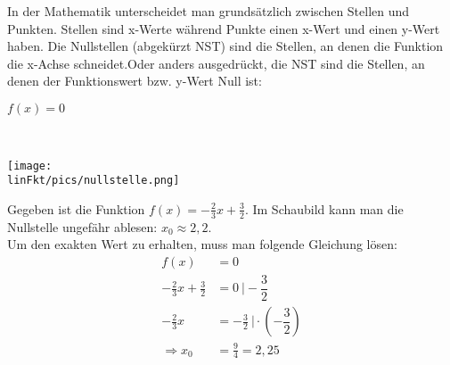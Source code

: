 In der Mathematik unterscheidet man grundsätzlich zwischen Stellen und Punkten. Stellen sind x-Werte während Punkte einen x-Wert und einen y-Wert haben. Die Nullstellen (abgekürzt NST) sind die Stellen, an denen die Funktion die x-Achse schneidet.Oder anders ausgedrückt, die NST sind die Stellen, an denen der Funktionswert bzw. y-Wert Null ist:
\begin{tcolorbox}
	\centering
	\textcolor{loestc}{$f(x)=0$}
\end{tcolorbox}
\begin{bsp}\phantom{A}\vspace{0.2cm}\\
	\begin{minipage}{0.55\textwidth}
		\texttt{[image: \\linFkt/pics/nullstelle.png]}
	\end{minipage}
	\begin{minipage}{0.45\textwidth}
		Gegeben ist die Funktion $f(x)=-\tfrac{2}{3}x+\tfrac{3}{2}$.
		Im Schaubild kann man die Nullstelle ungefähr ablesen: $x_0\approx 2,2$.\\
		Um den exakten Wert zu erhalten, muss man folgende Gleichung lösen:
		\begin{align*}
			f(x)&=0\\
			-\tfrac{2}{3}x+\tfrac{3}{2}&=0\ \rvert-\dfrac{3}{2}\\
			-\tfrac{2}{3}x&=-\tfrac{3}{2}\ \rvert\cdot\left(-\dfrac{3}{2}\right)\\
			\Rightarrow x_0&=\tfrac{9}{4}=2,25
		\end{align*}
	\end{minipage}
\end{bsp}

